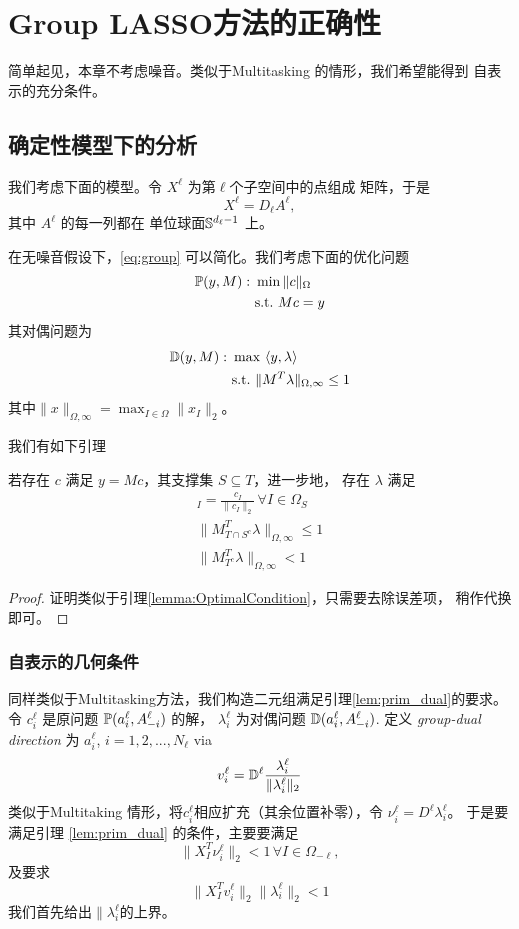 \documentclass[main.tex]{subfiles}
\begin{document}
\chapter{Group LASSO方法的正确性}\label{chp:proof_group}
简单起见，本章不考虑噪音。类似于Multitasking 的情形，我们希望能得到
自表示的充分条件。

\section{确定性模型下的分析}
我们考虑下面的模型。令 $X^\ell$ 为第$\ell$个子空间中的点组成
矩阵，于是
$$ X^\ell = D_\ell A^{\ell} ,$$ 
其中 $A^\ell$ 的每一列都在 单位球面$\S^{d_\ell-1}$ 上。

在无噪音假设下，\ref{eq:group} 可以简化。我们考虑下面的优化问题
\begin{align}
  \P(y,M): \,\, & \min \| c\|_{\Omega} \\
                & \mbox{s.t.}\,\, Mc = y
  \label{eq:group_primal}
\end{align}
其对偶问题为 
\begin{align}
  \D(y,M): \,\, &\max \,\, \langle y, \lambda\rangle \\
                & \mbox{s.t.}\,\, \|M^T\lambda\|_{\Omega,\infty} \leq 1
\end{align}
其中$\|x\|_{\Omega, \infty} = \max_{I \in \Omega} \|x_I\|_2$。

我们有如下引理 
\begin{lemma}
  \label{lem:prim_dual}
  若存在 $c$ 满足 $y = Mc$，其支撑集 $S \subseteq T$，进一步地，
  存在 $\lambda$ 满足
  \begin{align*}
    [M_{S}^T \lambda]_I = \frac{c_I}{\|c_I\|_2} \, \forall I \in \Omega_S\\
    \|M_{T\cap S^c}^T \lambda\|_{\Omega,\infty} \leq 1 \\
    \|M_{T^c}^T \lambda\|_{\Omega,\infty} < 1
  \end{align*}
\end{lemma}
\begin{proof}
  证明类似于引理\ref{lemma:OptimalCondition}，只需要去除误差项，
  稍作代换即可。
\end{proof}

\subsection{自表示的几何条件}
同样类似于Multitasking方法，我们构造二元组满足引理\ref{lem:prim_dual}的要求。
令 $c_{i}^{\ell}$ 是原问题 $\P(a_i^{\ell}, A_{-i}^{\ell})$ 的解，
$\lambda_i^{\ell}$ 为对偶问题 $\D(a_{i}^{\ell}, A_{-i}^{\ell})$.
定义 \emph{group-dual direction} 为 $a_{i}^{\ell}$, $i = 1,2,...,N_\ell$ via 
$$ v_i^\ell = \D^{\ell} \frac{\lambda_i^\ell}{\|\lambda_i^\ell \|_2} $$
类似于Multitaking 情形，将$c_i^{\ell}$相应扩充（其余位置补零），令 $\nu_i^\ell
= D^{\ell} \lambda_i^\ell$。 于是要满足引理 \ref{lem:prim_dual}
的条件，主要要满足 
$$ \| X^T_I \nu_i^\ell\|_2 < 1 \, \forall I \in \Omega_{-\ell},$$
及要求
$$\| X^T_I v_i^\ell\|_2 \|\lambda_i^\ell\|_2 < 1$$
我们首先给出$\|\lambda_i^\ell$的上界。
\end{document}
